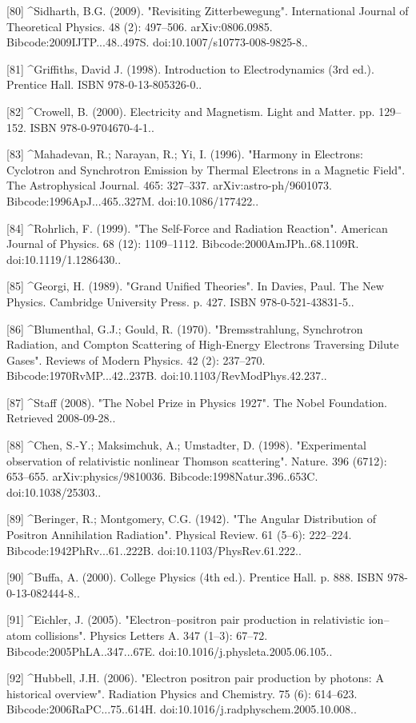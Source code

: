 [80]
^Sidharth, B.G. (2009). "Revisiting Zitterbewegung". International Journal of Theoretical Physics. 48 (2): 497–506. arXiv:0806.0985. Bibcode:2009IJTP...48..497S. doi:10.1007/s10773-008-9825-8..

[81]
^Griffiths, David J. (1998). Introduction to Electrodynamics (3rd ed.). Prentice Hall. ISBN 978-0-13-805326-0..

[82]
^Crowell, B. (2000). Electricity and Magnetism. Light and Matter. pp. 129–152. ISBN 978-0-9704670-4-1..

[83]
^Mahadevan, R.; Narayan, R.; Yi, I. (1996). "Harmony in Electrons: Cyclotron and Synchrotron Emission by Thermal Electrons in a Magnetic Field". The Astrophysical Journal. 465: 327–337. arXiv:astro-ph/9601073. Bibcode:1996ApJ...465..327M. doi:10.1086/177422..

[84]
^Rohrlich, F. (1999). "The Self-Force and Radiation Reaction". American Journal of Physics. 68 (12): 1109–1112. Bibcode:2000AmJPh..68.1109R. doi:10.1119/1.1286430..

[85]
^Georgi, H. (1989). "Grand Unified Theories". In Davies, Paul. The New Physics. Cambridge University Press. p. 427. ISBN 978-0-521-43831-5..

[86]
^Blumenthal, G.J.; Gould, R. (1970). "Bremsstrahlung, Synchrotron Radiation, and Compton Scattering of High-Energy Electrons Traversing Dilute Gases". Reviews of Modern Physics. 42 (2): 237–270. Bibcode:1970RvMP...42..237B. doi:10.1103/RevModPhys.42.237..

[87]
^Staff (2008). "The Nobel Prize in Physics 1927". The Nobel Foundation. Retrieved 2008-09-28..

[88]
^Chen, S.-Y.; Maksimchuk, A.; Umstadter, D. (1998). "Experimental observation of relativistic nonlinear Thomson scattering". Nature. 396 (6712): 653–655. arXiv:physics/9810036. Bibcode:1998Natur.396..653C. doi:10.1038/25303..

[89]
^Beringer, R.; Montgomery, C.G. (1942). "The Angular Distribution of Positron Annihilation Radiation". Physical Review. 61 (5–6): 222–224. Bibcode:1942PhRv...61..222B. doi:10.1103/PhysRev.61.222..

[90]
^Buffa, A. (2000). College Physics (4th ed.). Prentice Hall. p. 888. ISBN 978-0-13-082444-8..

[91]
^Eichler, J. (2005). "Electron–positron pair production in relativistic ion–atom collisions". Physics Letters A. 347 (1–3): 67–72. Bibcode:2005PhLA..347...67E. doi:10.1016/j.physleta.2005.06.105..

[92]
^Hubbell, J.H. (2006). "Electron positron pair production by photons: A historical overview". Radiation Physics and Chemistry. 75 (6): 614–623. Bibcode:2006RaPC...75..614H. doi:10.1016/j.radphyschem.2005.10.008..

